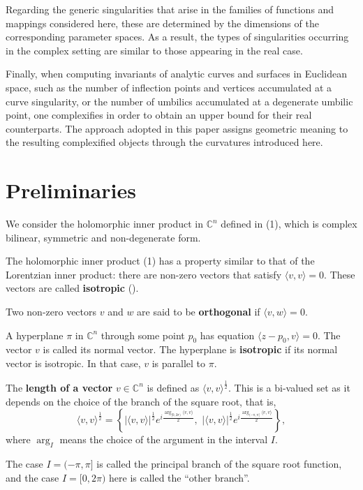 \documentclass[12pt,a4paper]{article}
\begin{document}
Regarding the generic singularities that arise in the families of functions and mappings considered here, these are determined by the dimensions of the corresponding parameter spaces. As a result, the types of singularities occurring in the complex setting are similar to those appearing in the real case.

Finally, when computing invariants of analytic curves and surfaces in Euclidean space, such as the number of inflection points and vertices accumulated at a curve singularity, or the number of umbilics accumulated at a degenerate umbilic point, one complexifies in order to obtain an upper bound for their real counterparts. The approach adopted in this paper assigns geometric meaning to the resulting complexified objects through the curvatures introduced here.


\section{Preliminaries}\label{sec:prel}
We consider the holomorphic inner product in $\mathbb C^n$ defined in (1), which is complex bilinear, symmetric and non-degenerate form.

The holomorphic inner product (1) has a property similar to that of the Lorentzian inner product: there are non-zero vectors that satisfy  $\langle v,v\rangle=0$. These vectors are called {\bf isotropic} (\cite{Struik}).

Two non-zero vectors $v$ and $w$ are said to be {\bf orthogonal} if $\langle v,w\rangle=0$.

A hyperplane $\pi$ in $\mathbb C^n$ through some point $p_0$ has equation $\langle z-p_0,v\rangle=0$. The vector $v$ is called its normal vector. The hyperplane is {\bf isotropic} if its normal vector is isotropic. In that case, $v$ is parallel to $\pi$.


The {\bf length of a vector} $v\in \mathbb C^n$ is defined as $\langle v,v\rangle^\frac12$. This is a bi-valued set as it depends on the choice of the branch of the square root, that is,
$$
\langle v,v\rangle^\frac12=\left\{ 
| \langle v,v\rangle|^\frac12 e^{i \frac{\arg_{[0, 2\pi)} \langle v,v\rangle}2},\,\,
| \langle v,v\rangle|^\frac12 e^{i \frac{\arg_{(-\pi, \pi]} \langle v,v\rangle}2} 
\right\},
$$
where $\arg_I$ means the choice of the argument in the interval $I$. 

The case $I=(-\pi, \pi]$ 
is called the principal branch of the square root function, and the case $I=[0,2\pi)$ here is called the 
``other branch''. 
\end{document}
